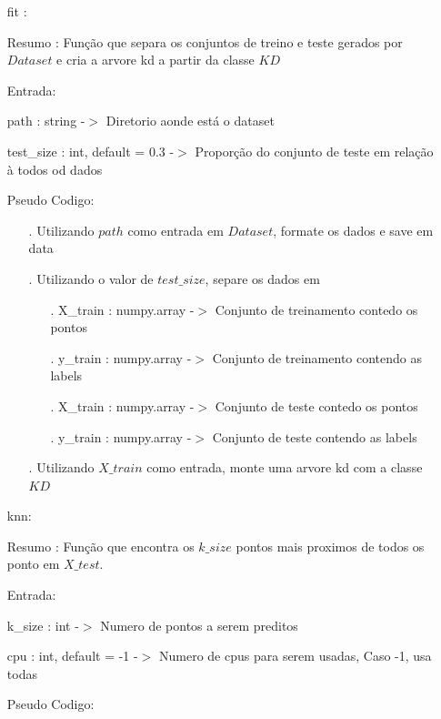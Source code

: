 \documentclass{article}
\begin{document}
	\begin{enumerate}
	
	\item[] fit : 
	
		\quad Resumo : Função que separa os conjuntos de treino e teste gerados por $Dataset$ e cria a arvore kd a partir da classe $KD$
	
		\quad Entrada: 
	
			\qquad path : string -$>$ Diretorio aonde está o dataset

			\qquad test\_size : int, default = 0.3 -$>$ Proporção do conjunto de teste em relação à todos od dados
	
		\quad Pseudo Codigo:
		
		\begin{enumerate}
	
		\item[.] Utilizando $path$ como entrada em $Dataset$, formate os dados e save em data
		\item[.] Utilizando o valor de $test\_size$, separe os dados em 
		
			\begin{enumerate}
			\item[.] X\_train : numpy.array -$>$ Conjunto de treinamento contedo os pontos
			\item[.] y\_train : numpy.array -$>$ Conjunto de treinamento contendo as labels
			\item[.] X\_train : numpy.array -$>$ Conjunto de teste contedo os pontos
			\item[.] y\_train : numpy.array -$>$ Conjunto de teste contendo as labels			
			\end{enumerate}

		\item[.] Utilizando $X\_train$ como entrada, monte uma arvore kd com a classe $KD$
	
		\end{enumerate}
	
	\item[] knn: 
	
		\quad Resumo : Função que encontra os $k\_size$ pontos mais proximos de todos os ponto em $X\_test$.

		\quad Entrada: 
	
			\qquad k\_size : int -$>$ Numero de pontos a serem preditos

			\qquad cpu : int, default = -1 -$>$ Numero de cpus para serem usadas, Caso -1, usa todas
	
		\quad Pseudo Codigo:
		

\end{enumerate}
\end{document}
